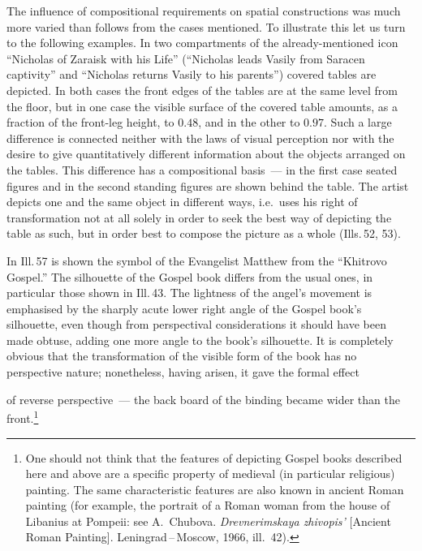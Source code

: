 The influence of compositional requirements on spatial constructions was much more
varied than follows from the cases mentioned.  To illustrate this let us turn to the
following examples.  In two compartments of the already-mentioned icon ``Nicholas of
Zaraisk with his Life'' (``Nicholas leads Vasily from Saracen captivity'' and
``Nicholas returns Vasily to his parents'') covered tables are depicted.  In both
cases the front edges of the tables are at the same level from the floor, but in one
case the visible surface of the covered table amounts, as a fraction of the front-leg
height, to $0.48$, and in the other to $0.97$.  Such a large difference is connected
neither with the laws of visual perception nor with the desire to give quantitatively
different information about the objects arranged on the tables.  This difference has
a compositional basis~--- in the first case seated figures and in the second standing
figures are shown behind the table.  The artist depicts one and the same object in
different ways, i.e.\ uses his right of transformation not at all solely in order to
seek the best way of depicting the table as such, but in order best to compose the
picture as a whole (Ills.\,52, 53).


In Ill.\,57 is shown the symbol of the Evangelist Matthew from the ``Khitrovo
Gospel.''  The silhouette of the Gospel book differs from the usual ones, in
particular those shown in Ill.\,43.  The lightness of the angel's movement is
emphasised by the sharply acute lower right angle of the Gospel book's silhouette,
even though from perspectival considerations it should have been made obtuse, adding
one more angle to the book's silhouette.  It is completely obvious that the
transformation of the visible form of the book has no perspective nature; nonetheless,
having arisen, it gave the formal effect


of reverse perspective~--- the back board of the binding became wider than the
front.\footnote{One should not think that the features of depicting Gospel books
  described here and above are a specific property of medieval (in particular
  religious) painting.  The same characteristic features are also known in ancient
  Roman painting (for example, the portrait of a Roman woman from the house of
  Libanius at Pompeii: see A.~Chubova.  \emph{Drevnerimskaya zhivopis'} [Ancient
  Roman Painting].  Leningrad\,--\,Moscow, 1966, ill.~42).}


